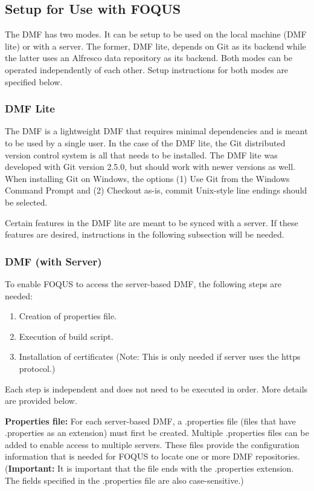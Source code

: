 \subsection{Setup for Use with FOQUS}
\label{dmf-setup}

The DMF has two modes. It can be setup to be used on the local machine (DMF lite) or with a server.
The former, DMF lite, depends on Git as its backend while the latter uses an Alfresco data repository as its backend.
Both modes can be operated independently of each other. Setup instructions for both modes are specified below.

\subsubsection{DMF Lite}
The DMF is a lightweight DMF that requires minimal dependencies and is meant to be used by a single user.
In the case of the DMF lite, the Git distributed version control system is all that needs to be installed.
The DMF lite
was developed with Git version 2.5.0, but should work with newer versions as well. When
installing Git on Windows, the options (1) Use Git from the Windows Command Prompt and
(2) Checkout as-is, commit Unix-style line endings should be selected.

Certain features in the DMF lite are meant to be synced with a server. If these features are desired,
instructions in the following subsection will be needed.

\subsubsection{DMF (with Server)}
\label{dmf-with-server}
To enable FOQUS to access the server-based DMF, the following steps are needed:
\begin{enumerate}
\item Creation of properties file.
\item Execution of build script.
\item Installation of certificates (Note: This is only needed if server uses the https protocol.)
\end{enumerate}
Each step is independent and does not need to be executed in order. More details are provided below.

\textbf{Properties file:}
For each server-based DMF, a
.properties file (files that have .properties as an extension) must first be created. Multiple
.properties files can be added to enable access to multiple servers.
These files provide the configuration information that
is needed for FOQUS to locate one or more DMF repositories.
(\textbf{Important:} It is important that the file ends with the .properties extension. The fields
specified in the .properties file are also case-sensitive.)

